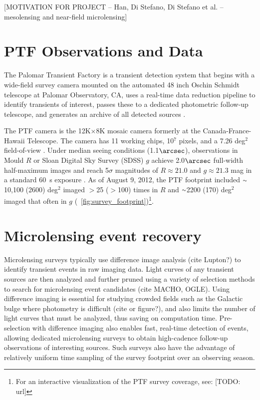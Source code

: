 \documentclass[12pt,preprint]{aastex}
\newcommand{\apwsim}{\raisebox{0.2ex}{\scriptsize$\sim$\normalsize}}
\begin{document}
[MOTIVATION FOR PROJECT -- Han, Di Stefano, Di Stefano et al. -- mesolensing and near-field microlensing]

\section{PTF Observations and Data}
The Palomar Transient Factory is a transient detection system that begins with a wide-field survey camera mounted on the automated 48 inch Oschin Schmidt telescope at Palomar Observatory, CA, uses a real-time data reduction pipeline to identify transients of interest, passes these to a dedicated photometric follow-up telescope, and generates an archive of all detected sources \citep{nick2009,rau2009}.

The PTF camera is the 12K$\times$8K mosaic camera formerly at the Canada-France-Hawaii Telescope. The camera has 11 working chips, 10$^7$ pixels, and a 7.26 deg$^2$ field-of-view \citep{rahmer2008}. Under median seeing conditions (1.1$\arcsec$), observations in Mould $R$ or Sloan Digital Sky Survey (SDSS) $g$ achieve 2.0$\arcsec$ full-width half-maximum images and reach 5$\sigma$ magnitudes of $R \approx 21.0$ and $g \approx 21.3$ mag in a standard 60~s exposure \citep{nick2010}. As of August 9, 2012, the PTF footprint included $\apwsim$10,100 (2600) deg$^2$ imaged $>$25 ($>$100) times in $R$ and $\apwsim$2200 (170) deg$^2$ imaged that often in $g$ (\figurename~\ref{fig:survey_footprint})\footnote{For an interactive visualization of the PTF survey coverage, see: [TODO: url]}.

\section{Microlensing event recovery} \label{sec:event_recovery}
Microlensing surveys typically use difference image analysis (cite Lupton?) to identify transient events in raw imaging data. Light curves of any transient sources are then analyzed and further pruned using a variety of selection methods to search for microlensing event candidates (cite MACHO, OGLE). Using difference imaging is essential for studying crowded fields such as the Galactic bulge where photometry is difficult (cite or figure?), and also limits the number of light curves that must be analyzed, thus saving on computation time. Pre-selection with difference imaging also enables fast, real-time detection of events, allowing dedicated microlensing surveys to obtain high-cadence follow-up observations of interesting sources. Such surveys also have the advantage of relatively uniform time sampling of the survey footprint over an observing season.
\end{document}
